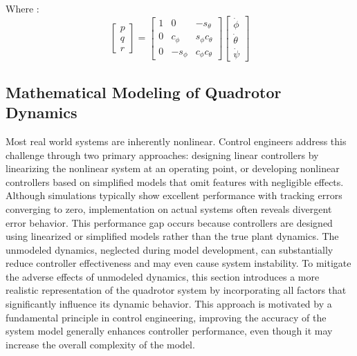 Where : 
\begin{equation}
\begin{bmatrix}
p \\ q \\ r
\end{bmatrix}
=
\begin{bmatrix}
1 & 0 & -s_\theta \\
0 & c_\phi & s_\phi c_\theta \\
0 & -s_\phi & c_\phi c_\theta
\end{bmatrix}
\begin{bmatrix}
\dot{\phi} \\ \dot{\theta} \\ \dot{\psi}
\end{bmatrix}
\label{3.8a}
\end{equation}

\subsection{Mathematical Modeling of Quadrotor Dynamics}


Most real world systems are inherently nonlinear. Control engineers address this challenge through two primary approaches: designing linear controllers by linearizing the nonlinear system at an operating point, or developing nonlinear controllers based on simplified models that omit features with negligible effects. Although simulations typically show excellent performance with tracking errors converging to zero, implementation on actual systems often reveals divergent error behavior. This performance gap occurs because controllers are designed using linearized or simplified models rather than the true plant dynamics. The unmodeled dynamics, neglected during model development, can substantially reduce controller effectiveness and may even cause system instability. To mitigate the adverse effects of unmodeled dynamics, this section introduces a more realistic representation of the quadrotor system by incorporating all factors that significantly influence its dynamic behavior. This approach is motivated by a fundamental principle in control engineering, improving the accuracy of the system model generally enhances controller performance, even though it may increase the overall complexity of the model.

